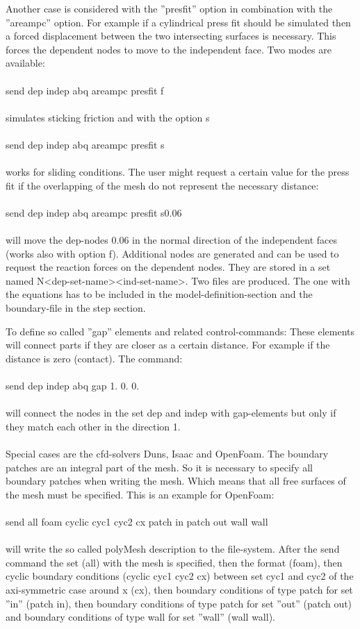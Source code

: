 \documentclass{article}
\begin{document}
Another case is considered with the ''presfit'' option in combination with the ''areampc'' option. For example if a cylindrical press fit should be simulated then a forced displacement between the two intersecting surfaces is necessary. This forces the dependent nodes to move to the independent face. Two modes are available:\\\\send dep indep abq areampc presfit f\\\\simulates sticking friction and with the option s\\\\send dep indep abq areampc presfit s\\\\works for sliding conditions. The user might request a certain value for the press fit if the overlapping of the mesh do not represent the necessary distance:\\\\send dep indep abq areampc presfit s0.06\\\\will move the dep-nodes 0.06 in the normal direction of the independent faces (works also with option f). Additional nodes are generated and can be used to request the reaction forces on the dependent nodes. They are stored in a set named N<dep-set-name><ind-set-name>. Two files are produced. The one with the equations has to be included in the model-definition-section and the boundary-file in the step section.

To define so called ''gap'' elements and related control-commands: These elements will connect parts if they are closer as a certain distance. For example if the distance is zero (contact). The command:\\\\send dep indep abq gap 1. 0. 0.\\\\will connect the nodes in the set dep and indep with gap-elements but only if they match each other in the direction 1.\\\\

Special cases are the cfd-solvers Duns, Isaac and OpenFoam. The boundary patches are an integral part of the mesh. So it is necessary to specify all boundary patches when writing the mesh. Which means that all free surfaces of the mesh must be specified. This is an example for OpenFoam:\\\\send all foam cyclic cyc1 cyc2 cx patch in patch out wall wall\\\\will write the so called polyMesh description to the file-system. After the send command the set (all) with the mesh is specified, then the format (foam), then cyclic boundary conditions (cyclic cyc1 cyc2 cx) between set cyc1 and cyc2 of the axi-symmetric case around x (cx), then boundary conditions of type patch for set ''in'' (patch in), then boundary conditions of type patch for set ''out'' (patch out) and boundary conditions of type wall for set ''wall'' (wall wall).
\end{document}
